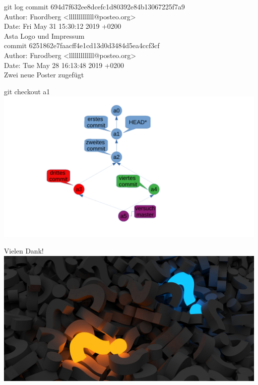 \documentclass{beamer}
\begin{document}
\begin{frame}{git log}
commit 694d7f632ee8dcefc1d80392e84b13067225f7a9 \\
Author: Fnordberg <lllllllllllll@posteo.org> \\
Date:   Fri May 31 15:30:12 2019 +0200 \\
    Asta Logo und Impressum \\
commit 6251862e7faacff4e1cd13d0d3484d5ea4ccf3cf \\
Author: Fnrodberg <lllllllllllll@posteo.org> \\
Date:   Tue May 28 16:13:48 2019 +0200 \\

    Zwei neue Poster zugefügt
\end{frame}

\begin{frame}{git checkout a1}
\includegraphics[scale=0.5]{pictures/checkout_a1.pdf}
\end{frame}


\begin{frame}{Vielen Dank!}
    \includegraphics[scale=0.17]{pictures/questions.jpg}
\end{frame}
\end{document}
